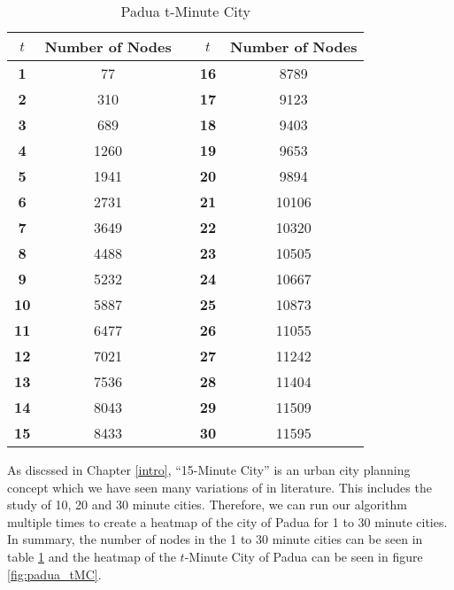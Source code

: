 \begin{table}[htbp]
    \begin{center}
        \caption{Padua t-Minute City}
        \label{tab:padua_tMC}
        \begin{tabular}{ccccc}
            \hline
            \textbf{$t$} & \textbf{Number of Nodes} & & \textbf{$t$} & \textbf{Number of Nodes} \\
            \hline
            \textbf{1} & 77 & & \textbf{16} & 8789 \\
            \textbf{2} & 310 & & \textbf{17} & 9123 \\
            \textbf{3} & 689 & & \textbf{18} & 9403 \\
            \textbf{4} & 1260 & & \textbf{19} & 9653 \\
            \textbf{5} & 1941 & & \textbf{20} & 9894 \\
            \textbf{6} & 2731 & & \textbf{21} & 10106 \\
            \textbf{7} & 3649 & & \textbf{22} & 10320 \\
            \textbf{8} & 4488 & & \textbf{23} & 10505 \\
            \textbf{9} & 5232 & & \textbf{24} & 10667 \\
            \textbf{10} & 5887 & & \textbf{25} & 10873 \\
            \textbf{11} & 6477 & & \textbf{26} & 11055 \\
            \textbf{12} & 7021 & & \textbf{27} & 11242 \\
            \textbf{13} & 7536 & & \textbf{28} & 11404 \\
            \textbf{14} & 8043 & & \textbf{29} & 11509 \\
            \textbf{15} & 8433 & & \textbf{30} & 11595 \\
            \hline
        \end{tabular}
    \end{center}
\end{table}

As discssed in Chapter \ref{intro}, ``15-Minute City'' is an urban city planning concept which we have seen many variations of in literature. This includes the study of 10, 20 and 30 minute cities. Therefore, we can run our algorithm multiple times to create a heatmap of the city of Padua for 1 to 30 minute cities. In summary, the number of nodes in the 1 to 30 minute cities can be seen in table \ref{tab:padua_tMC} and the heatmap of the $t$-Minute City of Padua can be seen in figure \ref{fig:padua_tMC}.

